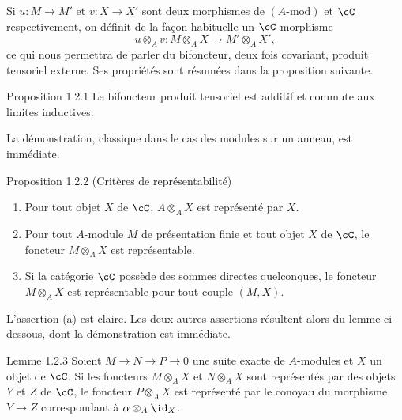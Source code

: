 Si $u:M\to M'$ et $v:X\to X'$ sont deux morphismes de $(A\text{-mod})$ et $\cC$ respectivement, on définit de la façon habituelle un $\cC$-morphisme
\[
u\otimes_A v:M\otimes_A X\longrightarrow M'\otimes_A X',
\]
ce qui nous permettra de parler du bifoncteur, deux fois covariant, produit tensoriel externe. Ses propriétés sont résumées dans la proposition suivante.

\begin{statement}{Proposition 1.2.1}
Le bifoncteur produit tensoriel est additif et commute aux limites inductives.
\end{statement}
La démonstration, classique dans le cas des modules sur un anneau, est immédiate.

\begin{statement}{Proposition 1.2.2 (Critères de représentabilité)}
\begin{enumerate}[label=(\alph*)]
\item Pour tout objet $X$ de $\cC$, $A\otimes_AX$ est représenté par $X$.
\item Pour tout $A$-module $M$ de présentation finie et tout objet $X$ de $\cC$, le foncteur $M\otimes_AX$ est représentable.
\item Si la catégorie $\cC$ possède des sommes directes quelconques, le foncteur $M\otimes_A X$ est représentable pour tout couple $(M,X)$.
\end{enumerate}
\end{statement}

\begin{prooftext}[Démonstration]
L'assertion (a) est claire. Les deux autres assertions résultent alors du lemme ci-dessous, dont la démonstration est immédiate.
\end{prooftext}

\begin{statement}{Lemme 1.2.3}
Soient $M\to N\to P\to0$ une suite exacte de $A$-modules et $X$ un objet de $\cC$. Si les foncteurs $M\otimes_A X$ et $N\otimes_A X$ sont représentés par des objets $Y$ et $Z$ de $\cC$, le foncteur $P\otimes_A X$ est représenté par le conoyau du morphisme $Y\to Z$ correspondant à $\alpha\otimes_A\id_X$.
\end{statement}

